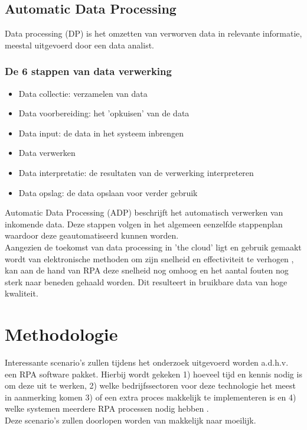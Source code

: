 \subsection{Automatic Data Processing}
Data processing (DP) is het omzetten van verworven data in relevante informatie, meestal uitgevoerd door een data analist. \autocite{whatIsDP}

\subsubsection{De 6 stappen van data verwerking}
\begin{itemize}
	\item Data collectie: verzamelen van data
	\item Data voorbereiding: het 'opkuisen' van de data
	\item Data input: de data in het systeem inbrengen
	\item Data verwerken
	\item Data interpretatie: de resultaten van de verwerking interpreteren
	\item Data opslag: de data opslaan voor verder gebruik
\end{itemize}  \autocite{whatIsDP}

Automatic Data Processing (ADP) beschrijft het automatisch verwerken van inkomende data. Deze stappen volgen in het algemeen eenzelfde stappenplan waardoor deze geautomatiseerd kunnen worden. \\
Aangezien de toekomst van data processing in 'the cloud' ligt en gebruik gemaakt wordt van elektronische methoden om zijn snelheid en effectiviteit te verhogen \autocite{whatIsDP}, kan aan de hand van RPA deze snelheid nog omhoog en het aantal fouten nog sterk naar beneden gehaald worden. Dit resulteert in bruikbare data van hoge kwaliteit.

\section{Methodologie}
\label{sec:methodologie}
Interessante scenario's zullen tijdens het onderzoek uitgevoerd worden a.d.h.v. een RPA software pakket. Hierbij wordt gekeken 1) hoeveel tijd en kennis nodig is om deze uit te werken, 2) welke bedrijfssectoren voor deze technologie het meest in aanmerking komen 3) of een extra proces makkelijk te implementeren is en 4) welke systemen meerdere RPA processen nodig hebben . \\
Deze scenario's zullen doorlopen worden van makkelijk naar moeilijk.

